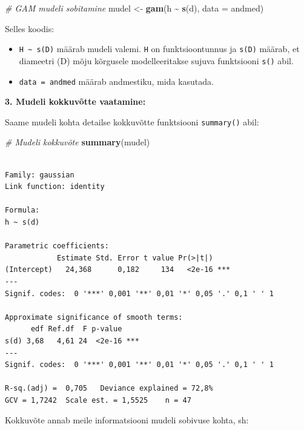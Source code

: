 \documentclass[
]{book}
\newenvironment{Shaded}{\begin{snugshade}}{\end{snugshade}}
\newcommand{\AttributeTok}[1]{\textcolor[rgb]{0.13,0.29,0.53}{#1}}
\newcommand{\CommentTok}[1]{\textcolor[rgb]{0.56,0.35,0.01}{\textit{#1}}}
\newcommand{\FunctionTok}[1]{\textcolor[rgb]{0.13,0.29,0.53}{\textbf{#1}}}
\newcommand{\NormalTok}[1]{#1}
\newcommand{\OtherTok}[1]{\textcolor[rgb]{0.56,0.35,0.01}{#1}}
\newcommand{\SpecialCharTok}[1]{\textcolor[rgb]{0.81,0.36,0.00}{\textbf{#1}}}
\providecommand{\tightlist}{%
  \setlength{\itemsep}{0pt}\setlength{\parskip}{0pt}}
\renewenvironment{Shaded} {\begin{snugshade}\footnotesize} {\end{snugshade}}
\begin{document}
\begin{Shaded}
\begin{Highlighting}[]
\CommentTok{\# GAM mudeli sobitamine}
\NormalTok{mudel }\OtherTok{\textless{}{-}} \FunctionTok{gam}\NormalTok{(h }\SpecialCharTok{\textasciitilde{}} \FunctionTok{s}\NormalTok{(d), }\AttributeTok{data =}\NormalTok{ andmed)}
\end{Highlighting}
\end{Shaded}

Selles koodis:

\begin{itemize}
\tightlist
\item
  \texttt{H\ \textasciitilde{}\ s(D)} määrab mudeli valemi. \texttt{H} on funktsioontunnus ja \texttt{s(D)} määrab, et diameetri (D) mõju kõrgusele modelleeritakse sujuva funktsiooni \texttt{s()} abil.
\item
  \texttt{data\ =\ andmed} määrab andmestiku, mida kasutada.
\end{itemize}

\textbf{3. Mudeli kokkuvõtte vaatamine:}

Saame mudeli kohta detailse kokkuvõtte funktsiooni \texttt{summary()} abil:

\begin{Shaded}
\begin{Highlighting}[]
\CommentTok{\# Mudeli kokkuvõte}
\FunctionTok{summary}\NormalTok{(mudel)}
\end{Highlighting}
\end{Shaded}

\begin{verbatim}

Family: gaussian 
Link function: identity 

Formula:
h ~ s(d)

Parametric coefficients:
            Estimate Std. Error t value Pr(>|t|)    
(Intercept)   24,368      0,182     134   <2e-16 ***
---
Signif. codes:  0 '***' 0,001 '**' 0,01 '*' 0,05 '.' 0,1 ' ' 1

Approximate significance of smooth terms:
      edf Ref.df  F p-value    
s(d) 3,68   4,61 24  <2e-16 ***
---
Signif. codes:  0 '***' 0,001 '**' 0,01 '*' 0,05 '.' 0,1 ' ' 1

R-sq.(adj) =  0,705   Deviance explained = 72,8%
GCV = 1,7242  Scale est. = 1,5525    n = 47
\end{verbatim}

Kokkuvõte annab meile informatsiooni mudeli sobivuse kohta, sh:
\end{document}
